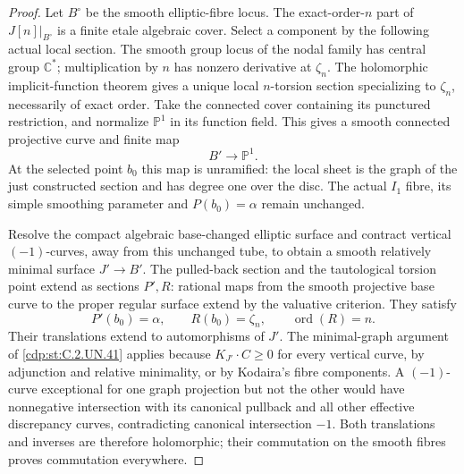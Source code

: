 \begin{proof}
Let $B^\circ$ be the smooth elliptic-fibre locus.
The exact-order-$n$ part of $J[n]|_{B^\circ}$ is a finite
etale algebraic cover. Select a component by the following
actual local section. The smooth group locus of the nodal
family has central group $\mathbb C^*$; multiplication by
$n$ has nonzero derivative at $\zeta_n$. The holomorphic
implicit-function theorem gives a unique local $n$-torsion
section specializing to $\zeta_n$, necessarily of exact order.
Take the connected cover containing its punctured restriction,
and normalize $\mathbb P^1$ in its function field. This gives
a smooth connected projective curve and finite map
\[
                             B'\longrightarrow\mathbb P^1.
\tag{C.SH.6}\label{cdp:eq:C.SH.6}
\]
At the selected point $b_0$ this map is unramified: the local
sheet is the graph of the just constructed section and has
degree one over the disc. The actual $I_1$ fibre, its simple
smoothing parameter and $P(b_0)=\alpha$ remain unchanged.

Resolve the compact algebraic base-changed elliptic surface
and contract vertical $(-1)$-curves, away from this unchanged
tube, to obtain a smooth relatively minimal surface $J'\to B'$.
The pulled-back section and the tautological torsion point
extend as sections $P',R$: rational maps from the smooth
projective base curve to the proper regular surface extend by
the valuative criterion. They satisfy
\[
                 P'(b_0)=\alpha,\qquad R(b_0)=\zeta_n,
                 \qquad \operatorname{ord}(R)=n.
\tag{C.SH.7}\label{cdp:eq:C.SH.7}
\]
Their translations extend to automorphisms of $J'$.
The minimal-graph argument of \ref{cdp:st:C.2.UN.41} applies because
$K_{J'}\cdot C\ge0$ for every vertical curve, by adjunction
and relative minimality, or by Kodaira's fibre components.
A $(-1)$-curve exceptional for one graph projection but not
the other would have nonnegative intersection with its
canonical pullback and all other effective discrepancy
curves, contradicting canonical intersection $-1$.
Both translations and inverses are therefore holomorphic;
their commutation on the smooth fibres proves commutation
everywhere.


\end{proof}

